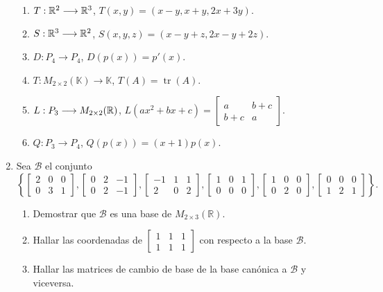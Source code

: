 \begin{enumerate}[topsep=6pt, itemsep=.4cm]
    \begin{enumerate}
        \item\label{lineales1-bases-a} $T:\mathbb R^2 \longrightarrow \mathbb R^3$, $T(x,y)=(x-y,x+y,2x+3y)$.
        \item\label{lineales1-bases-b} $S:\mathbb R^3 \longrightarrow \mathbb R^2$, $S(x,y,z)=(x-y+z,2x-y+2z)$.
        \item\label{lineales1-base-c} $D:P_4  \longrightarrow P_4$, $D(p(x))=p'(x)$.
        \item $T:M_{2\times 2}(\mathbb{K}) \longrightarrow \mathbb{K}$, $T(A)=\operatorname{tr}(A)$.
        \item\label{lineales1-base-d} $L:P_3 \longrightarrow M_{2\times 2}(\mathbb R)$, $L(ax^2+bx+c)=\begin{bmatrix} a & b+c \\ b+c & a \end{bmatrix}$.
        \item\label{lineales1-base-e} $Q:P_3 \longrightarrow P_4$, $Q(p(x))=(x+1)p(x)$.
    \end{enumerate}



\item Sea $\mathcal{B}$ el conjunto 
$$
\left\{
\begin{bmatrix}
2 & 0& 0 \\
0 & 3& 1
\end{bmatrix},
\begin{bmatrix}
0& 2& -1\\
0& 2&-1
\end{bmatrix},
\begin{bmatrix}
-1 &1&1 \\
2 & 0 &2
\end{bmatrix},
\begin{bmatrix}
1 &0 &1\\
0 &0 &0
\end{bmatrix},
\begin{bmatrix}
1& 0& 0\\
0 &2 &0
\end{bmatrix},
\begin{bmatrix}
0 &0 & 0\\
1 & 2&1
\end{bmatrix}
\right\}.$$


\begin{enumerate}
    \item Demostrar que
    $\mathcal{B}$ es una base de $M_{2\times3}(\mathbb{R})$.
    \item Hallar las coordenadas de
    $
    \begin{bmatrix}
    1 & 1& 1 \\
    1 & 1& 1
    \end{bmatrix}$ con respecto a la base $\mathcal{B}$.
    \item Hallar las matrices de cambio de base de la base can\'onica
    a $\mathcal{B}$ y viceversa.
\end{enumerate}




\end{enumerate}
